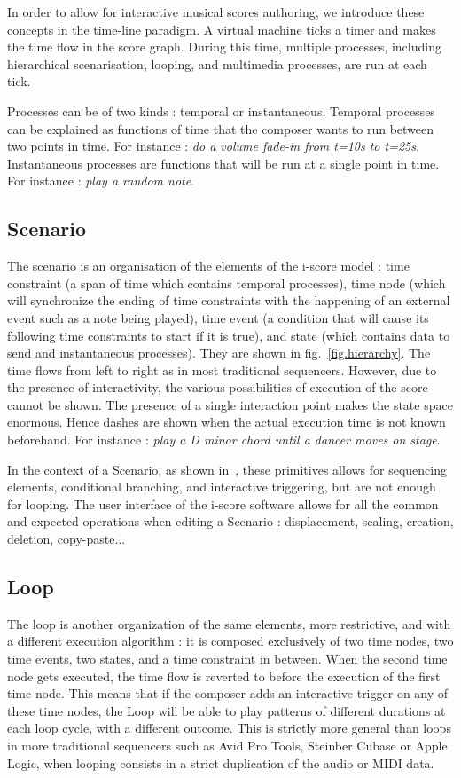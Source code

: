 \documentclass{article}
\begin{document}
In order to allow for interactive musical scores authoring, we introduce these concepts in the time-line paradigm.
A virtual machine ticks a timer and makes the time flow in the score graph. 
During this time, multiple processes, including hierarchical scenarisation, looping, and multimedia processes, are 
run at each tick. 

Processes can be of two kinds : temporal or instantaneous.
Temporal processes can be explained as functions of time that the composer wants to run between 
two points in time. 
For instance : \emph{do a volume fade-in from t=10s to t=25s}.~\\
Instantaneous processes are functions that will be run at a single point in time.
For instance : \emph{play a random note}.

\subsection{Scenario}
The scenario is an organisation of the elements of the i-score model : time constraint (a span of time which contains temporal processes), time node (which will synchronize the ending of time constraints with the happening of an external event such as a note being played), time event (a condition that will cause its following time constraints to start if it is true), and state (which contains data to send and instantaneous processes).
They are shown in fig.~\ref{fig.hierarchy}. 
The time flows from left to right as in most traditional sequencers. 
However, due to the presence of interactivity, the various possibilities of execution of the score cannot be shown. 
The presence of a single interaction point makes the state space enormous.
Hence dashes are shown when the actual execution time is not known beforehand. 
For instance : \emph{play a D minor chord until a dancer moves on stage}.

In the context of a Scenario, as shown in~\cite{celerier2015ossia}, these primitives allows for sequencing elements, conditional branching, and interactive triggering, but are not enough for looping.
The user interface of the i-score software allows for all the common and expected operations when editing a Scenario : displacement, scaling, creation, deletion, copy-paste...

\subsection{Loop}
The loop is another organization of the same elements, more restrictive, and with a different execution algorithm : it is 
composed exclusively of two time nodes, two time events, two states, and a time constraint in between.
When the second time node gets executed, the time flow is reverted to before the execution of the first time node.
This means that if the composer adds an interactive trigger on any of these time nodes, the Loop will be able to play patterns of different durations at each loop cycle, with a different outcome.
This is strictly more general than loops in more traditional sequencers such as Avid Pro Tools, Steinber Cubase or Apple Logic, when looping consists in a strict duplication of the audio or MIDI data.
\end{document}
